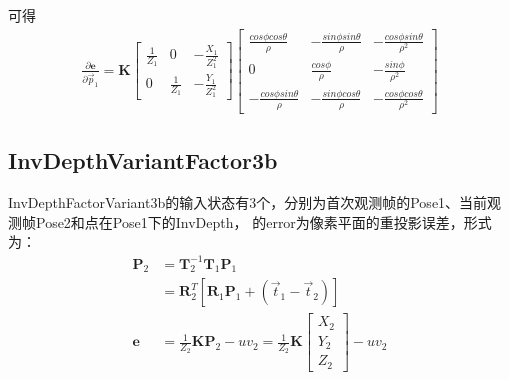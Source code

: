 \documentclass{article}
\begin{document}
可得
\begin{equation}
	\begin{aligned}
		\frac{\partial{\boldsymbol{e}}}{\partial{\vec{p}_1}}=\boldsymbol K 
		\left[
		\begin{matrix}
		\frac{1}{Z_1}                   & 0                               & -\frac{X_1}{Z_1^2}                \\
		0                               & \frac{1}{Z_1}                   & -\frac{Y_1}{Z_1^2}                
		\end{matrix}
		\right]
		\left[
		\begin{matrix}
		\frac{cos\phi cos\theta}{\rho}  & -\frac{sin\phi sin\theta}{\rho} & -\frac{cos\phi sin\theta}{\rho^2} \\
		0                               & \frac{cos\phi}{\rho}            & -\frac{sin\phi}{\rho^2}           \\
		-\frac{cos\phi sin\theta}{\rho} & -\frac{sin\phi cos\theta}{\rho} & -\frac{cos\phi cos\theta}{\rho^2} 
		\end{matrix}
		\right] 
	\end{aligned}
\end{equation}

\subsection{InvDepthVariantFactor3b}
InvDepthFactorVariant3b的输入状态有3个，分别为首次观测帧的Pose1、当前观测帧Pose2和点在Pose1下的InvDepth， 的error为像素平面的重投影误差，形式为：
\begin{equation}
	\begin{aligned}
		\boldsymbol{P}_2 & =\boldsymbol{T}_2^{-1}\boldsymbol{T}_1\boldsymbol{P}_1                        \\&=
		\boldsymbol{R}_2^{T}[ \boldsymbol{R}_1\boldsymbol{P}_1 +(\vec{t}_1-\vec{t}_2)] \\
		\boldsymbol {e}  & =\frac{1}{Z_2}\boldsymbol K\boldsymbol{P}_2 -uv_2 =\frac{1}{Z_2}\boldsymbol K 
		\left[
		\begin{matrix}
		X_2 \\
		Y_2 \\
		Z_2 
		\end{matrix}
		\right]-uv_2
	\end{aligned}
\end{equation}
\end{document}
